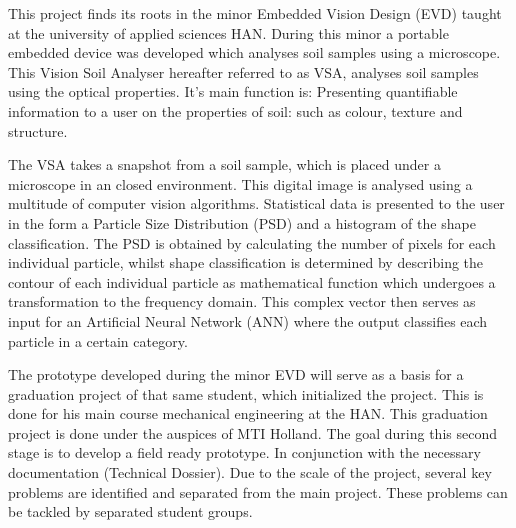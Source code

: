 This project finds its roots in the minor Embedded Vision Design (EVD) taught at the university of applied sciences HAN. During this minor a portable embedded device was developed which analyses soil samples using a microscope. This Vision Soil Analyser hereafter referred to as VSA, analyses soil samples using the optical properties. It’s main function is: Presenting quantifiable information to a user on the properties of soil: such as colour, texture and structure.

The VSA takes a snapshot from a soil sample, which is placed under a microscope in an closed environment. This digital image is analysed using a multitude of computer vision algorithms. Statistical data is presented to the user in the form a Particle Size Distribution (PSD) and a histogram of the shape classification. The PSD is obtained by calculating the number of pixels for each individual particle, whilst shape classification is determined by describing the contour of each individual particle as mathematical function which undergoes a transformation to the frequency domain. This complex vector then serves as input for an Artificial Neural Network (ANN) where the output classifies each particle in a certain category.

The prototype developed during the minor EVD will serve as a basis for a graduation project of that same student, which initialized the project. This is done for his main course mechanical engineering at the HAN. This graduation project is done under the auspices of MTI Holland. The goal during this second stage is to develop a field ready prototype. In conjunction with the necessary documentation (Technical Dossier). 
Due to the scale of the project, several key problems are identified and separated from the main project. These problems can be tackled by separated student groups.